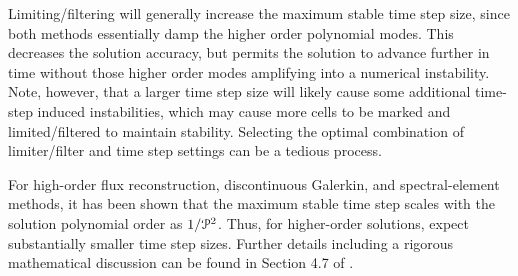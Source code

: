 
\label{SEC:Time:Controlling:Indirectly:Limiting}

Limiting\slash filtering will generally increase the maximum stable time step
size, since both methods essentially damp the higher order polynomial modes.
%
This decreases the solution accuracy, but permits the solution to advance
further in time without those higher order modes amplifying into a numerical 
instability.
%
Note, however, that a larger time step size will likely cause some additional
time-step induced instabilities, which may cause more cells to be marked and
limited\slash filtered to maintain stability.
%
Selecting the optimal combination of limiter/filter and time step settings
can be a tedious process.


\label{SEC:Time:Controlling:Indirectly:P_vs_dt}

For high-order flux reconstruction, discontinuous Galerkin, and spectral-element
methods, it has been shown that the maximum stable time step scales with the
solution polynomial order as $1/\mathcal{P}_{\textsl{}}^2$\cite{Hesthaven_2010, Huynh_2014}.
%
Thus, for higher-order solutions, expect substantially smaller time step sizes.
%
Further details including a rigorous mathematical discussion can be found in
Section 4.7 of .


\label{SEC:Time:Controlling:Indirectly:P_vs_CFL}

